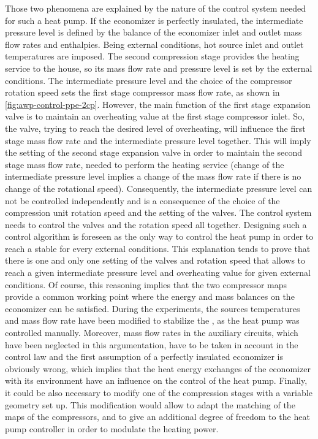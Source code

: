 Those two phenomena are explained by the nature of the control system
needed for such a heat pump. If the economizer is perfectly insulated,
the intermediate pressure level is defined by the balance of the
economizer inlet and outlet mass flow rates and enthalpies. Being
external conditions, hot source inlet and outlet temperatures are
imposed. The second compression stage provides the heating service to
the house, so its mass flow rate and pressure level is set by the
external conditions. The intermediate pressure level and the choice of
the compressor rotation speed sets the first stage compressor mass
flow rate, as shown in \cref{fig:awp-control-ppe-2cp}. However, the
main function of the first stage expansion valve is to maintain an
overheating value at the first stage compressor inlet. So, the valve,
trying to reach the desired level of overheating, will influence the
first stage mass flow rate and the intermediate pressure level
together.  This will imply the setting of the second stage expansion
valve in order to maintain the second stage mass flow rate, needed to
perform the heating service (change of the intermediate pressure level
implies a change of the mass flow rate if there is no change of the
rotational speed). Consequently, the intermediate pressure level can
not be controlled independently and is a consequence of the choice of
the compression unit rotation speed and the setting of the valves. The
control system needs to control the valves and the rotation speed all
together. Designing such a control algorithm is foreseen as the only
way to control the heat pump in order to reach a stable \OP{} for
every external conditions. This explanation tends to prove that there
is one and only one setting of the valves and rotation speed that
allows to reach a given intermediate pressure level and overheating
value for given external conditions. Of course, this reasoning implies
that the two compressor maps provide a common working point where the
energy and mass balances on the economizer can be satisfied. During
the experiments, the sources temperatures and mass flow rate have been
modified to stabilize the \OP{}, as the heat pump was controlled
manually. Moreover, mass flow rates in the auxiliary circuits, which
have been neglected in this argumentation, have to be taken in account
in the control law and the first assumption of a perfectly insulated
economizer is obviously wrong, which implies that the heat energy
exchanges of the economizer with its environment have an influence on
the control of the heat pump. Finally, it could be also necessary to
modify one of the compression stages with a variable geometry set
up. This modification would allow to adapt the matching of the maps of
the compressors, and to give an additional degree of freedom to the
heat pump controller in order to modulate the heating power.

